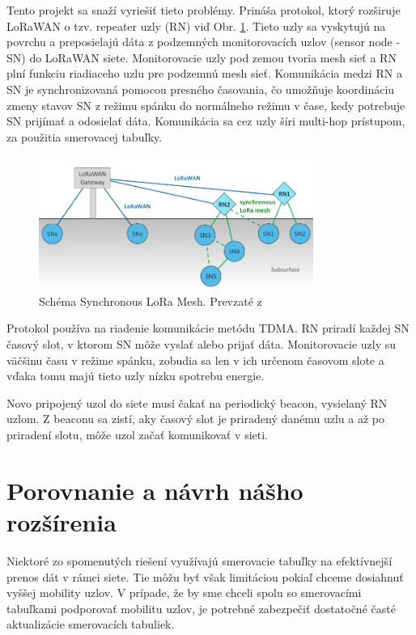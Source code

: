 \documentclass[slovak,master]{diploma}
\begin{document}
Tento projekt sa snaží vyriešiť tieto problémy. Prináša protokol, ktorý rozširuje LoRaWAN o tzv. repeater uzly (RN) viď Obr. \ref{fig:synchronouslora}. Tieto uzly sa vyskytujú na povrchu a preposielajú dáta z 
podzemných monitorovacích uzlov (sensor node  - SN) do LoRaWAN siete. Monitorovacie uzly pod zemou tvoria mesh sieť a RN plní funkciu riadiaceho uzlu pre podzemnú mesh sieť. 
Komunikácia medzi RN a SN je synchronizovaná pomocou presného časovania, čo umožňuje koordináciu zmeny stavov SN z režimu spánku do normálneho režimu v čase, kedy 
potrebuje SN prijímať a odosielať dáta. Komunikácia sa cez uzly šíri multi-hop prístupom, za použitia smerovacej tabuľky.

\begin{figure}[h!]
	\centering
	\includegraphics[width=0.8\textwidth]{Figures/synchronouslorameshnetwork.png}
	\caption{Schéma Synchronous LoRa Mesh. Prevzaté z \cite{synchronouslorameshnetwork}}
	\label{fig:synchronouslora}
\end{figure}

Protokol používa na riadenie komunikácie metódu TDMA. RN priradí každej SN časový slot, v ktorom SN môže vyslať alebo prijať dáta.
Monitorovacie uzly su väčšinu času v režime spánku, zobudia sa len v ich určenom časovom slote a vďaka tomu majú tieto uzly nízku spotrebu energie.

Novo pripojený uzol do siete musí čakať na periodický beacon, vysielaný RN uzlom. Z beaconu sa zistí, aky časový slot je priradený danému uzlu a až po priradení slotu, môže uzol začať komunikovať v sieti.



\section{Porovnanie a návrh nášho rozšírenia}
Niektoré zo spomenutých riešení využívajú smerovacie tabuľky na efektívnejší prenos dát v rámci siete. Tie môžu byť však limitáciou pokiaľ 
chceme dosiahnuť vyššej mobility uzlov. V prípade, že by sme chceli spolu so smerovacími tabuľkami podporovať mobilitu uzlov, je potrebné zabezpečiť 
dostatočné časté aktualizácie smerovacích tabuliek.
\end{document}
